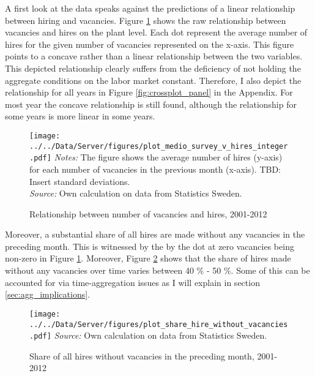 A first look at the data speaks against the predictions of a linear relationship between hiring and vacancies. Figure \ref{fig:crossplot} shows the raw relationship between vacancies and hires on the plant level. Each dot represent the average number of hires for the given number of vacancies represented on the x-axis. This figure points to a concave rather than a linear relationship between the two variables. This depicted relationship clearly suffers from the deficiency of not holding the aggregate conditions on the labor market constant. Therefore, I also depict the relationship for all years in Figure \ref{fig:crossplot_panel} in the Appendix. For most year the concave relationship is still found, although the relationship for some years is more linear in some years. 

\begin{figure}[h]
\centering
\caption{Relationship between number of vacancies and hires, 2001-2012}
\texttt{[image: ../../Data/Server/figures/plot\_medio\_survey\_v\_hires\_integer.pdf]}
\flushleft
\footnotesize{\emph{Notes:} The figure shows the average number of hires (y-axis) for each number of vacancies in the previous month (x-axis). TBD: Insert standard deviations.} \\
\footnotesize{\emph{Source:} Own calculation on data from Statistics Sweden.}
\label{fig:crossplot}
\end{figure}

Moreover, a substantial share of all hires are made without any vacancies in the preceding month. This is witnessed by the by the dot at zero vacancies being non-zero in Figure \ref{fig:crossplot}. Moreover, Figure \ref{fig:share_without} shows that the share of hires made without any vacancies over time varies between 40 \% - 50 \%. Some of this can be accounted for via time-aggregation issues as I will explain in section \ref{sec:agg_implications}. 

\begin{figure}[h]
\centering
\caption{Share of all hires without vacancies in the preceding month, 2001-2012}
\texttt{[image: ../../Data/Server/figures/plot\_share\_hire\_without\_vacancies.pdf]}
\flushleft
\footnotesize{\emph{Source:} Own calculation on data from Statistics Sweden.}
\label{fig:share_without}
\end{figure}

